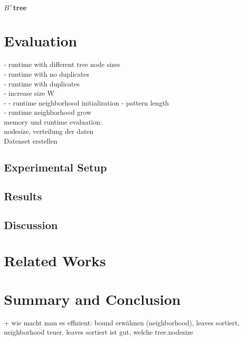 \documentclass[abstracton,12pt]{scrreprt}
\begin{document}
\subsubsection{$B^+$tree}

\chapter{Evaluation}
\label{sec:Experimental}

- runtime with different tree node sizes \\
- runtime with no duplicates\\
- runtime with duplicates\\
- increase size W\\
- 
- runtime neighborhood initialization - pattern length\\
- runtime neighborhood grow\\

memory und runtime evaluation:\\ 
nodesize, verteilung der daten \\
Datenset erstellen \\


\section{Experimental Setup}
\section{Results}
\section{Discussion}


\chapter{Related Works}


\chapter{Summary and Conclusion}
\label{sec:Summary}

+ wie macht man es effizient: bound erwähnen (neighborhood), leaves sortiert, neighborhood teuer. leaves sortiert ist gut, 
welche tree.nodesize
\end{document}
